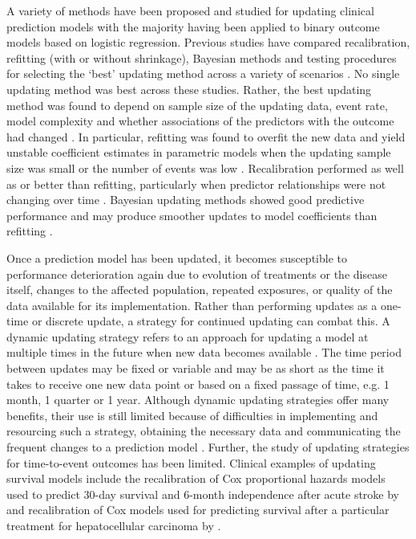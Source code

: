 \documentclass[]{article}
\begin{document}
A variety of methods have been proposed and studied for updating clinical prediction models with the majority having been applied to binary outcome models based on logistic regression. Previous studies have compared recalibration, refitting (with or without shrinkage), Bayesian methods and testing procedures for selecting the `best’ updating method across a variety of scenarios \citep{Janssen2008, Hickey2013, Sim2016, Siregar2016, Vergouwe2016, Su2018, Davis2019, Davis2020, Schnellinger2021, Riley2021, Feng2022}. No single updating method was best across these studies. Rather, the best updating method was found to depend on sample size of the updating data, event rate, model complexity and whether associations of the predictors with the outcome had changed \citep{Janssen2008, Siregar2016, Vergouwe2016, Davis2019, Riley2021}. In particular, refitting was found to overfit the new data and yield unstable coefficient estimates in parametric models when the updating sample size was small or the number of events was low \citep{Hickey2013, Siregar2016, Vergouwe2016, Schnellinger2021}. Recalibration performed as well as or better than refitting, particularly when predictor relationships were not changing over time \citep{Janssen2008, Su2018, Booth2020, Schnellinger2021}. Bayesian updating methods showed good predictive performance and may produce smoother updates to model coefficients than refitting \citep{Hickey2013, Siregar2016, Su2018}.


Once a prediction model has been updated, it becomes susceptible to performance deterioration again due to evolution of treatments or the disease itself, changes to the affected population, repeated exposures, or quality of the data available for its implementation. Rather than performing updates as a one-time or discrete update, a strategy for continued updating can combat this. A dynamic updating strategy refers to an approach for updating a model at multiple times in the future when new data becomes available \citep{Jenkins2021, Schnellinger2021}. The time period between updates may be fixed or variable and may be as short as the time it takes to receive one new data point or based on a fixed passage of time, e.g. 1 month, 1 quarter or 1 year. Although dynamic updating strategies offer many benefits, their use is still limited because of difficulties in implementing and resourcing such a strategy, obtaining the necessary data and communicating the frequent changes to a prediction model \citep{Hickey2013, Jenkins2021}. Further, the study of updating strategies for time-to-event outcomes has been limited. Clinical examples of updating survival models include the recalibration of Cox proportional hazards models used to predict 30-day survival and 6-month independence after acute stroke by  \citet{Sim2016} and recalibration of Cox models used for predicting survival after a particular treatment for hepatocellular carcinoma by \citet{Cucchetti2021}. 
\end{document}
